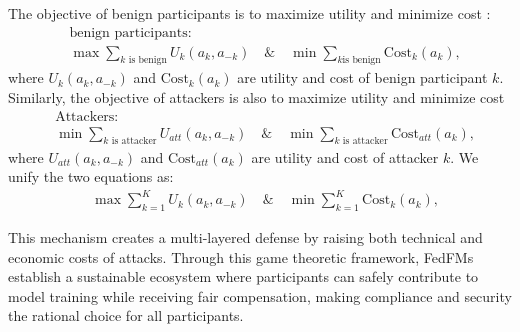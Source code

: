 The objective of benign participants is to maximize utility and minimize cost \cite{sarikaya2019motivating,pandey2020crowdsourcing,khan2020federated}:
\begin{equation*}
\label{eq:game_strategy_1}
\begin{aligned}
&\text{benign participants:}  \\
&\max \sum_{k \text{ is benign}} U_k(a_k, a_{-k}) \quad \& \quad \min \sum_{k \text{is 
 benign}}\text{Cost}_k(a_k),
\end{aligned}
\end{equation*}
where $U_k(a_k, a_{-k})$ and $\text{Cost}_k(a_k)$ are utility and cost of benign participant $k$. Similarly, the objective of attackers is also to maximize utility and minimize cost
\begin{equation*}
\label{eq:game_strategy_2}
\begin{aligned}
&\text{Attackers:}  \\
&\min\sum_{k\text{ is 
attacker}} U_{att}(a_k, a_{-k}) \quad \& \quad \min \sum_{k\text{ is attacker}}\text{Cost}_{att}(a_k),
\end{aligned}
\end{equation*}
where $U_{att}(a_k, a_{-k})$ and $\text{Cost}_{att}(a_k)$ are utility and cost of attacker $k$. We unify the two equations as:
\begin{equation}
    \begin{aligned}
&\max \sum_{k=1}^K U_k(a_k, a_{-k}) \quad \& \quad \min \sum_{k=1}^K\text{Cost}_k(a_k),
\end{aligned}
\end{equation}




This mechanism creates a multi-layered defense by raising both technical and economic costs of attacks. Through this game theoretic framework, FedFMs establish a sustainable ecosystem where participants can safely contribute to model training while receiving fair compensation, making compliance and security the rational choice for all participants.



